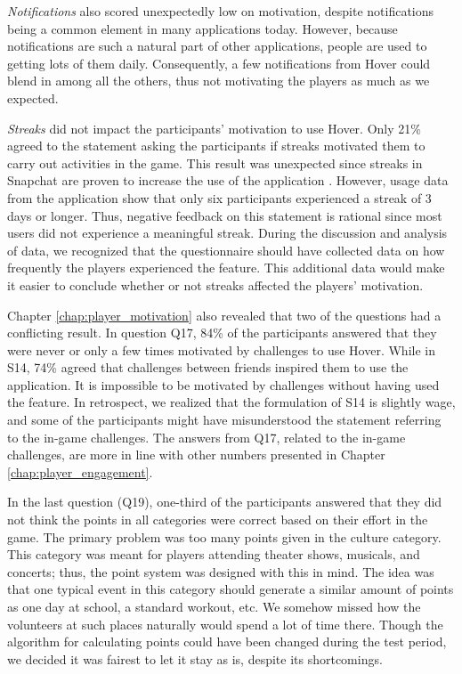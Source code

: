 \textit{Notifications} also scored unexpectedly low on motivation, despite notifications being a common element in many applications today. However, because notifications are such a natural part of other applications, people are used to getting lots of them daily. Consequently, a few notifications from Hover could blend in among all the others, thus not motivating the players as much as we expected.

\textit{Streaks} did not impact the participants’ motivation to use Hover. Only 21\% agreed to the statement asking the participants if streaks motivated them to carry out activities in the game. This result was unexpected since streaks in Snapchat are proven to increase the use of the application \citep{hristova_snapchat_2019}. However, usage data from the application show that only six participants experienced a streak of 3 days or longer. Thus, negative feedback on this statement is rational since most users did not experience a meaningful streak. During the discussion and analysis of data, we recognized that the questionnaire should have collected data on how frequently the players experienced the feature. This additional data would make it easier to conclude whether or not streaks affected the players’ motivation.

Chapter \ref{chap:player_motivation} also revealed that two of the questions had a conflicting result. In question Q17, 84\% of the participants answered that they were never or only a few times motivated by challenges to use Hover. While in S14, 74\% agreed that challenges between friends inspired them to use the application. It is impossible to be motivated by challenges without having used the feature. In retrospect, we realized that the formulation of S14 is slightly wage, and some of the participants might have misunderstood the statement referring to the in-game challenges. The answers from Q17, related to the in-game challenges, are more in line with other numbers presented in Chapter \ref{chap:player_engagement}.

In the last question (Q19), one-third of the participants answered that they did not think the points in all categories were correct based on their effort in the game. The primary problem was too many points given in the culture category. This category was meant for players attending theater shows, musicals, and concerts; thus, the point system was designed with this in mind. The idea was that one typical event in this category should generate a similar amount of points as one day at school, a standard workout, etc. We somehow missed how the volunteers at such places naturally would spend a lot of time there. Though the algorithm for calculating points could have been changed during the test period, we decided it was fairest to let it stay as is, despite its shortcomings.

